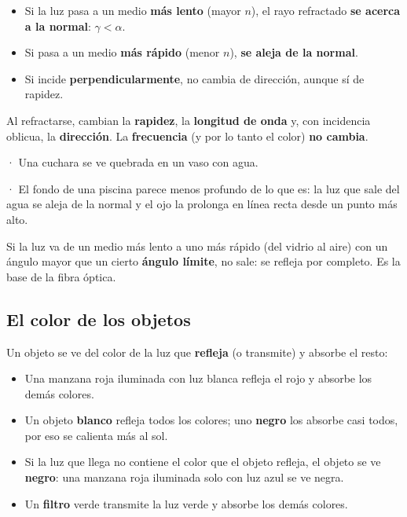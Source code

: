 \begin{itemize}
  \item Si la luz pasa a un medio \textbf{más lento} (mayor $n$), el rayo refractado \textbf{se acerca a la normal}: $\gamma < \alpha$.
  \item Si pasa a un medio \textbf{más rápido} (menor $n$), \textbf{se aleja de la normal}.
  \item Si incide \textbf{perpendicularmente}, no cambia de dirección, aunque sí de rapidez.
\end{itemize}
  
\begin{clave} Al refractarse, cambian la \textbf{rapidez}, la \textbf{longitud de onda} y, con incidencia oblicua, la \textbf{dirección}. La \textbf{frecuencia} (y por lo tanto el color) \textbf{no cambia}.\end{clave}
 
\begin{ejemplo}[{Ejemplos}] · Una cuchara se ve quebrada en un vaso con agua.\par · El fondo de una piscina parece menos profundo de lo que es: la luz que sale del agua se aleja de la normal y el ojo la prolonga en línea recta desde un punto más alto.\end{ejemplo}
 
\begin{clave} Si la luz va de un medio más lento a uno más rápido (del vidrio al aire) con un ángulo mayor que un cierto \textbf{ángulo límite}, no sale: se refleja por completo. Es la base de la fibra óptica.\end{clave}
\subsection{El color de los objetos}
Un objeto se ve del color de la luz que \textbf{refleja} (o transmite) y absorbe el resto:

 
\begin{itemize}
  \item Una manzana roja iluminada con luz blanca refleja el rojo y absorbe los demás colores.
  \item Un objeto \textbf{blanco} refleja todos los colores; uno \textbf{negro} los absorbe casi todos, por eso se calienta más al sol.
  \item Si la luz que llega no contiene el color que el objeto refleja, el objeto se ve \textbf{negro}: una manzana roja iluminada solo con luz azul se ve negra.
  \item Un \textbf{filtro} verde transmite la luz verde y absorbe los demás colores.
\end{itemize}
 

